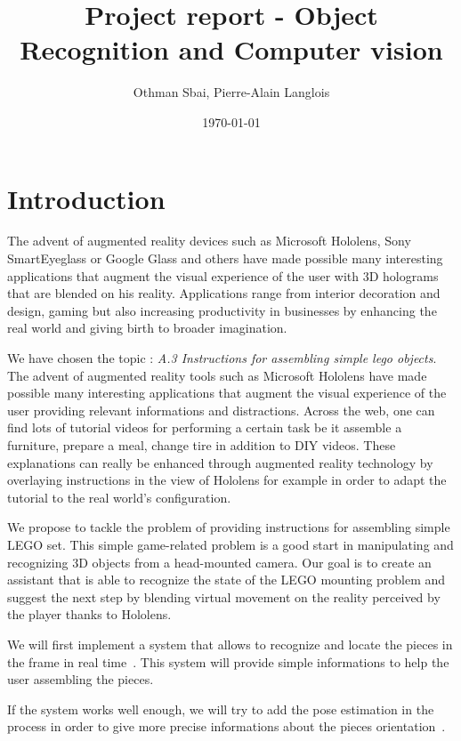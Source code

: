 \documentclass[a4paper,10pt]{article}
\title{Project report - Object Recognition and Computer vision}
\author{Othman Sbai, Pierre-Alain Langlois}
\date\today
\begin{document}
\maketitle

\section{Introduction}
The advent of augmented reality devices such as Microsoft Hololens, Sony SmartEyeglass or Google Glass and others have made possible many interesting applications that augment the visual experience of the user with 3D holograms that are blended on his reality. Applications range from interior decoration and design, gaming but also increasing productivity in businesses by enhancing the real world and giving birth to broader imagination.

\newpage

We have chosen the topic : \emph{A.3 Instructions for assembling simple lego objects}.
\smallbreak
The advent of augmented reality tools such as Microsoft Hololens have made possible many interesting 
applications that augment the visual experience of the user providing relevant informations and 
distractions. Across the web, one can find lots of tutorial videos for performing a certain task be it 
assemble a furniture, prepare a meal, change tire in addition to DIY videos. These explanations can 
really be enhanced through augmented reality technology by overlaying instructions in the view of Hololens 
for example in order to adapt the tutorial to the real world’s configuration. 
\smallbreak

We propose to tackle the problem of providing instructions for assembling simple LEGO set. This simple 
game-related problem is a good start in manipulating and recognizing 3D objects from a head-mounted camera. 
Our goal is to create an assistant that is able to recognize the state of the LEGO mounting problem and 
suggest the next step by blending virtual movement on the reality perceived by the player thanks to 
Hololens.

\smallbreak

We will first implement a system that allows to recognize and locate the pieces in the frame in real time~\cite{redmon_you_2015}. 
This system will provide simple informations to help the user assembling the pieces.

If the system works well enough, we will try to add the pose estimation in the process in order to give 
more precise informations about the pieces orientation~\cite{wohlhart_learning_2015}.
\end{document}
